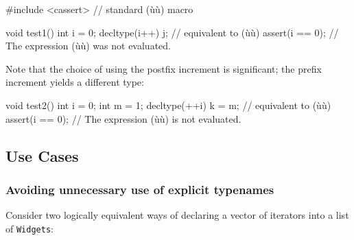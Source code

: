 \begin{emcppshiddenlisting}[emcppsbatch=e3]
#include <cassert>  // standard (ù{}ù) macro
\end{emcppshiddenlisting}
\begin{emcppslisting}[emcppsbatch=e3]
void test1()
{
    int i = 0;
    decltype(i++) j;  // equivalent to (ù{}ù)
    assert(i == 0);   // The expression (ù{}ù) was not evaluated.
}
\end{emcppslisting}
Note that the choice of using the postfix increment is significant; the prefix increment yields a different type:
\begin{emcppslisting}[emcppsbatch=e3]
void test2()
{
    int i = 0;
    int m = 1;
    decltype(++i) k = m; // equivalent to (ù{}ù)
    assert(i == 0); // The expression (ù{}ù) is not evaluated.
}
\end{emcppslisting}

\subsection[Use Cases]{Use Cases}\label{use-cases-decltype}

\subsubsection[Avoiding unnecessary use of explicit typenames]{Avoiding unnecessary use of explicit typenames}\label{avoiding-unnecessary-use-of-explicit-typenames}

Consider two logically equivalent ways of declaring a vector of
iterators into a list of \lstinline!Widgets!:

